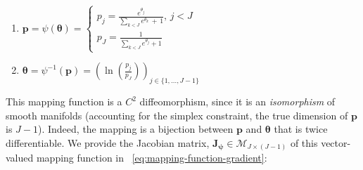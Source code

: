 \documentclass[long, final]{jobim}
\begin{document}
\begin{multicols}{2}
\label{eq:mapping-function}
\begin{enumerate}[label=\emph{\alph*})]
\item $\boldsymbol{p} = \psi (\boldsymbol{\theta}) =
\begin{cases}
p_j =  \frac{e^{\theta_j}}{\sum_{k < J} e^{\theta_k} \, + \, 1}, \, j < J\\
p_J =  \frac{1}{\sum_{k < J} e^{\theta_j} + 1}
\end{cases}$
\item $\boldsymbol{\theta} = \psi^{-1} (\boldsymbol{p}) = \left(\ln{\left( \frac{p_j}{p_J}\right)} \right)_{j \in \{ 1, \ldots, J -1\}}$
\end{enumerate}
\end{multicols}


This mapping function is a $C^2$ diffeomorphism, since it is an \textit{isomorphism} of smooth manifolds (accounting for the simplex constraint, the true dimension of $\boldsymbol{p}$ is $J-1$). Indeed, the mapping is a bijection between $\boldsymbol{p}$ and $\boldsymbol{\theta}$ that is twice differentiable. We provide the Jacobian matrix, $\mathbf{J}_{\boldsymbol{\psi}} \in \mathcal{M}_{J \times (J-1)}$ of this vector-valued mapping function in \equationname~\ref{eq:mapping-function-gradient}: 
\end{document}

